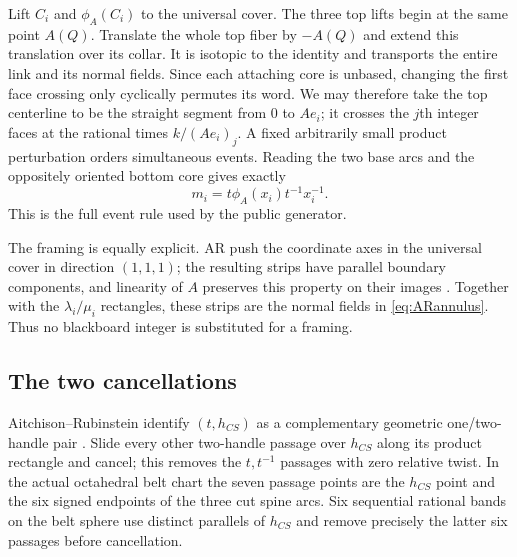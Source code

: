\documentclass[11pt]{amsart}
\theoremstyle{definition}
\theoremstyle{remark}
\begin{document}
Lift $C_i$ and $\phi_A(C_i)$ to the universal cover.  The three top lifts
begin at the same point $A(Q)$.  Translate the whole top fiber by $-A(Q)$ and
extend this translation over its collar.  It is isotopic to the identity and
transports the entire link and its normal fields.  Since each attaching core
is unbased, changing the first face crossing only cyclically permutes its
word.  We may therefore take the top centerline to be the straight segment
from $0$ to $Ae_i$; it crosses the $j$th integer faces at
the rational times $k/(Ae_i)_j$.  A fixed arbitrarily small product
perturbation orders simultaneous events.  Reading the two base arcs and the
oppositely oriented bottom core gives exactly
\begin{equation}\label{eq:actualword}
m_i=t\phi_A(x_i)t^{-1}x_i^{-1}.
\end{equation}
This is the full event rule used by the public generator.

The framing is equally explicit.  AR push the coordinate axes in the
universal cover in direction $(1,1,1)$; the resulting strips have parallel
boundary components, and linearity of $A$ preserves this property on their
images \cite[pp.~16--17]{AitchisonRubinstein1984}.  Together with the
$\lambda_i/\mu_i$ rectangles, these strips are the normal fields in
\eqref{eq:ARannulus}.  Thus no blackboard integer is substituted for a
framing.

\subsection{The two cancellations}

Aitchison--Rubinstein identify $(t,h_{CS})$ as a complementary geometric
one/two-handle pair \cite[p.~7]{AitchisonRubinstein1984}.  Slide every other
two-handle passage over $h_{CS}$ along its product rectangle and cancel; this
removes the $t,t^{-1}$ passages with zero relative twist.
In the actual octahedral belt chart the seven passage points are the
$h_{CS}$ point and the six signed endpoints of the three cut spine arcs.
Six sequential rational bands on the belt sphere use distinct parallels of
$h_{CS}$ and remove precisely the latter six passages before cancellation.
\end{document}
